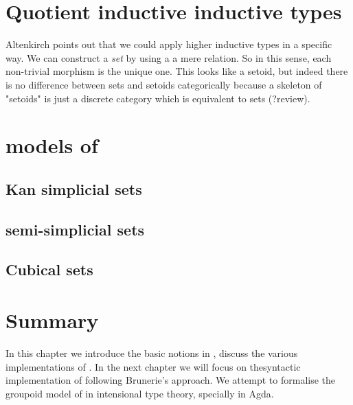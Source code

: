 \section{Quotient inductive inductive types}

Altenkirch points out that we could apply higher inductive types in a
specific way. We can construct a \emph{set} by using a a mere
relation. So in this sense, each non-trivial morphism is the unique
one. This looks like a setoid, but indeed there is no difference
between sets and setoids categorically because a skeleton of "setoids"
is just a discrete category which is equivalent to sets (?review).




\section{models of \hott}

\subsection{Kan simplicial sets}

\subsection{semi-simplicial sets}

\subsection{Cubical sets}


\section{Summary}

In this chapter we introduce the basic notions in \hott, discuss the
various implementations of \hott. In the next chapter we will focus on
thesyntactic implementation of \wog following
Brunerie's approach. We attempt to formalise the groupoid model of
\hott in intensional type theory, specially in Agda.



